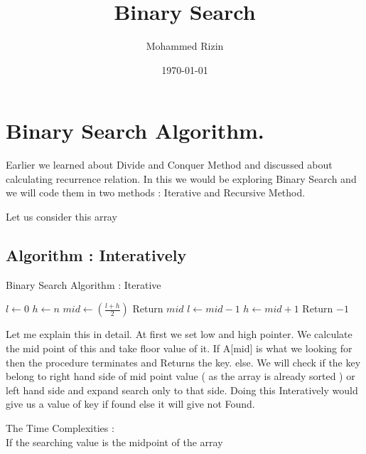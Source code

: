 \documentclass[11pt, a4paper]{article}
\title{Binary Search}
\author[1]{Mohammed Rizin \note{He's amazing}}
\affiliation[1]{Unemployed, GitHub Accounts}
\date{\today}
\newcommand{\drawArray}[2]{%
    \newcount\arrayLength
    \begin{figure}[H]
        \centering
        \begin{tikzpicture}
            \coordinate (s) at (0, 0);
            \def\found{0}
            \arrayLength=0
            \foreach \num [count=\i from 0] in {#1} {
                \node[rectangle, draw, minimum size=8mm] at (s) {\num};
                \ifnum\num=#2
                    \node at ($(s)-(0,1.1)$) {$\underbrace{\i}_{key}$};
                    \xdef\found{1}
                \else
                    \node at ($(s)-(0,0.8)$) {\i};
                \fi
                
                \coordinate (s) at ($(s) + (0.8, 0)$);
                \ifnum\found=0
                \global\advance\arrayLength by 1
                \fi
            }
            \ifnum\found=0
                \node at ($0.45*(s) + (0, -1.0)$) {Not Found!};
            \fi
        \end{tikzpicture}
        \caption{Searching for key = #2 after \the\arrayLength \text{ steps}}
    \end{figure}
}
\begin{document}
\maketitle
\section{Binary Search Algorithm.}\label{intro}


Earlier we learned about Divide and Conquer Method and discussed about calculating recurrence relation. In this we would be exploring Binary Search and we will code them in two methods : Iterative and Recursive Method.

Let us consider this array
\def\A{1, 2, 4, 5, 7, 23, 23, 34, 44, 51, 54}

\expandafter\drawArray\expandafter{\A}{7}

\subsection{Algorithm : Interatively}
\begin{algorithm}[H]
    \caption{Binary Search Algorithm : Iterative}
    \label{binarySearchrec}
    \begin{algorithmic}
            \State $l \gets 0$
            \State $h \gets n$
            \State $mid \gets \left(\frac{l + h}{2}\right)$
                \State Return $mid$
            \EndIf
                \State $l \leftarrow mid - 1$
            \Else 
                \State $h \leftarrow mid + 1$
            \EndIf
        \EndWhile
        \State Return $-1$
        \EndProcedure
    \end{algorithmic}
\end{algorithm}

Let me explain this in detail.
At first we set low and high pointer. We calculate the mid point of this and take floor value of it. If A[mid] is what we looking for then the procedure terminates and Returns the key. else. We will check if the key belong to right hand side of mid point value ( as the array is already sorted ) or left hand side and expand search only to that side. Doing this Interatively would give us a value of key if found else it will give not Found.

The Time Complexities :\\
If the searching value is the midpoint of the array
\\
\end{document}
